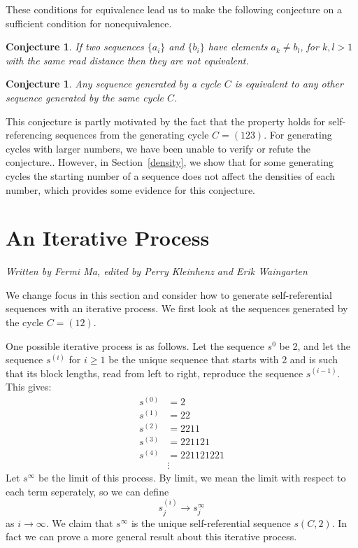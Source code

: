 \documentclass[runningheads,a4paper]{llncs}
\newtheorem{conj}[theorem]{Conjecture}
\begin{document}
These conditions for equivalence lead us to make the following conjecture on a sufficient condition for nonequivalence.

\begin{conj} If two sequences $\{a_i\}$ and $\{b_i\}$ have elements $a_k \neq b_l$, for $k,l>1$ with the same read distance then they are not equivalent. 
\end{conj}

\begin{conj} Any sequence generated by a cycle $C$ is equivalent to any other sequence generated by the same cycle $C$.
\end{conj}

This conjecture is partly motivated by the fact that the property holds for self-referencing sequences from the generating cycle $C= (123)$. For generating cycles with larger numbers, we have been unable to verify or refute the conjecture.. However, in Section~\ref{density}, we show that for some generating cycles the starting number of a sequence does not affect the densities of each number, which provides some evidence for this conjecture.

\section{An Iterative Process}
\label{iterativeprocess}

\emph{Written by Fermi Ma, edited by Perry Kleinhenz and Erik Waingarten}

We change focus in this section and consider how to generate self-referential sequences with an iterative process. We first look at the sequences generated by the cycle $C = (1 2)$.

One possible iterative process is as follows. Let the sequence $s^0$ be 2, and let the sequence $s^{(i)}$ for $i \geq 1$ be the unique sequence that starts with 2 and is such that its block lengths, read from left to right, reproduce the sequence $s^{(i-1)}$. This gives:
\begin{align*}
s^{(0)}&= 2\\
s^{(1)} &= 22\\
s^{(2)} &= 2211\\
s^{(3)}&= 221121\\
s^{(4)} &= 221121221\\
&\vdots
\end{align*}
Let $s^\infty$ be the limit of this process. 
By limit, we mean the limit with respect to each term seperately, so we can define
\[ s^{(i)}_j \rightarrow s^\infty_j \]
as $i \rightarrow \infty$. We claim that $s^\infty$ is the unique self-referential sequence $s(C,2)$. In fact we can prove a more general result about this iterative process.
\end{document}
